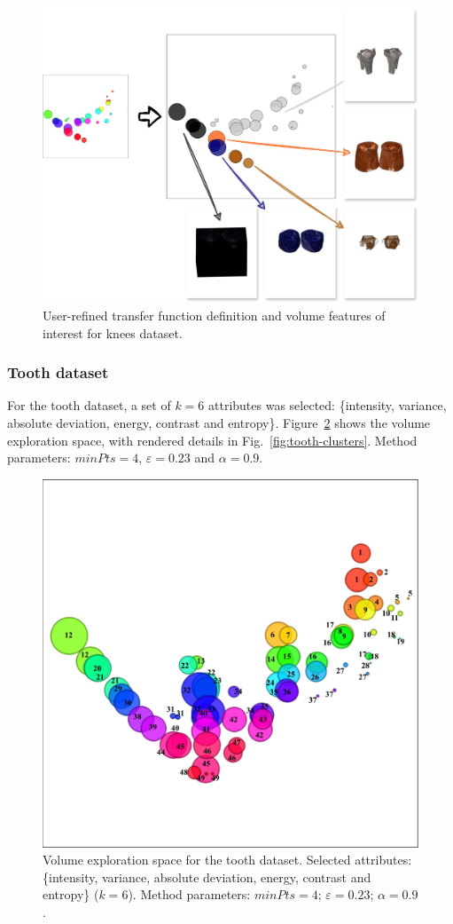 \begin{figure}[htb!]
    \centering
    \includegraphics[width=\columnwidth]{figs/knees-groups.jpg}
    \caption{User-refined transfer function definition and volume features of interest for knees dataset.}
    \label{fig:knees-groups}
\end{figure}

\subsubsection{Tooth dataset}
\label{subsubsect:tooth-dataset}

For the tooth dataset, a set of \(k = 6\) attributes was selected: \{intensity, variance, absolute deviation, energy, contrast and entropy\}. Figure~\ref{fig:tooth-clusters-tf} shows the volume exploration space, with rendered details in Fig.~\ref{fig:tooth-clusters}. Method parameters: $minPts=4$, $\varepsilon=0.23$ and $\alpha=0.9$.

\begin{figure}[htb!]
    \centering
    \includegraphics[width=0.7\columnwidth]{figs/tooth-clusters-tf.jpg} 
    \caption{Volume exploration space for the tooth dataset. Selected attributes: \{intensity, variance, absolute deviation, energy, contrast and entropy\} (\(k=6\)). Method parameters: $minPts=4$; $\varepsilon=0.23$; $\alpha=0.9$.}
    \label{fig:tooth-clusters-tf}
\end{figure}

